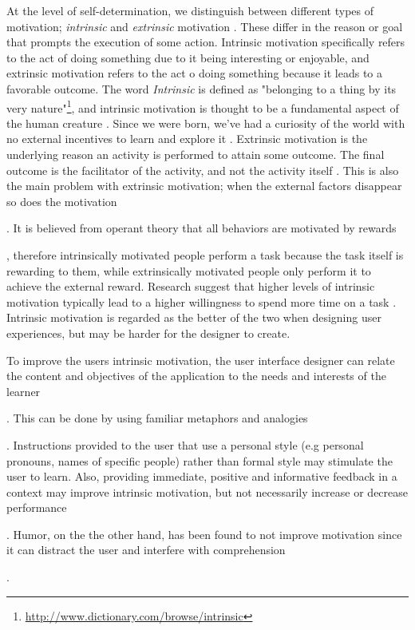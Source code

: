 At the level of self-determination, we distinguish between different types of motivation; \textit{intrinsic} and \textit{extrinsic} motivation \cite{Ryan2000a}. These differ in the reason or goal that prompts the execution of some action. Intrinsic motivation specifically refers to the act of doing something due to it being interesting or enjoyable, and extrinsic motivation refers to the act o doing something because it leads to a favorable outcome. The word \textit{Intrinsic} is defined as "belonging to a thing by its very nature"\footnote{\url{http://www.dictionary.com/browse/intrinsic}}, and intrinsic motivation is thought to be a fundamental aspect of the human creature \cite{White1959}. Since we were born, we've had a curiosity of the world with no external incentives to learn and explore it \cite{Ryan2000a}. Extrinsic motivation is the underlying reason an activity is performed to attain some outcome. The final outcome is the facilitator of the activity, and not the activity itself \cite{Ryan2000a}. This is also the main problem with extrinsic motivation; when the external factors disappear so does the motivation . It is believed from operant theory that all behaviors are motivated by rewards , therefore intrinsically motivated people perform a task because the task itself is rewarding to them, while extrinsically motivated people only perform it to achieve the external reward. Research suggest that higher levels of intrinsic motivation typically lead to a higher willingness to spend more time on a task \cite{Deci1975}. Intrinsic motivation is regarded as the better of the two when designing user experiences, but may be harder for the designer to create.

To improve the users intrinsic motivation, the user interface designer can relate the content and objectives of the application to the needs and interests of the learner . This can be done by using familiar metaphors and analogies . Instructions provided to the user that use a personal style (e.g personal pronouns, names of specific people) rather than formal style may stimulate the user to learn. Also, providing immediate, positive and informative feedback in a context may improve intrinsic motivation, but not necessarily increase or decrease performance . Humor, on the the other hand, has been found to not improve motivation since it can distract the user and interfere with comprehension .


